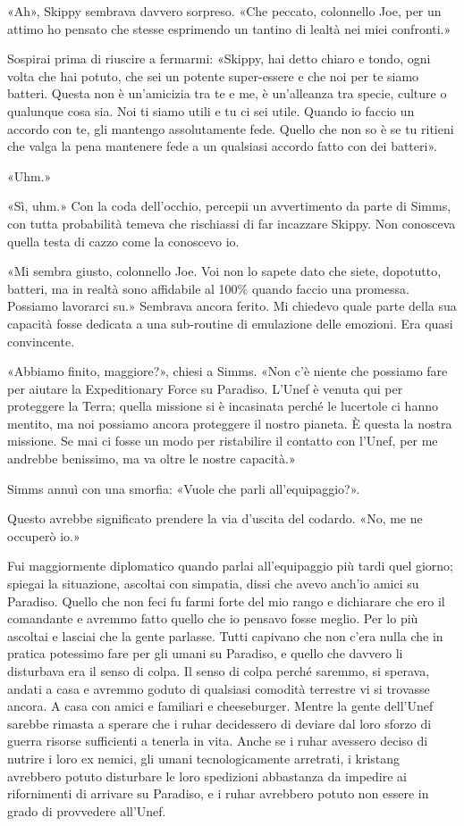 «Ah», Skippy sembrava davvero sorpreso. «Che peccato, colonnello Joe,
per un attimo ho pensato che stesse esprimendo un tantino di lealtà nei
miei confronti.»

Sospirai prima di riuscire a fermarmi: «Skippy, hai detto chiaro e
tondo, ogni volta che hai potuto, che sei un potente super-essere e che
noi per te siamo batteri. Questa non è un'amicizia tra te e me, è
un'alleanza tra specie, culture o qualunque cosa sia. Noi ti siamo utili
e tu ci sei utile. Quando io faccio un accordo con te, gli mantengo
assolutamente fede. Quello che non so è se tu ritieni che valga la pena
mantenere fede a un qualsiasi accordo fatto con dei batteri».

«Uhm.»

«Sì, uhm.» Con la coda dell'occhio, percepii un avvertimento da parte di
Simms, con tutta probabilità temeva che rischiassi di far incazzare
Skippy. Non conosceva quella testa di cazzo come la conoscevo io.

«Mi sembra giusto, colonnello Joe. Voi non lo sapete dato che siete,
dopotutto, batteri, ma in realtà sono affidabile al 100\% quando faccio
una promessa. Possiamo lavorarci su.» Sembrava ancora ferito. Mi
chiedevo quale parte della sua capacità fosse dedicata a una sub-routine
di emulazione delle emozioni. Era quasi convincente.

«Abbiamo finito, maggiore?», chiesi a Simms. «Non c'è niente che
possiamo fare per aiutare la Expeditionary Force su Paradiso. L'Unef è
venuta qui per proteggere la Terra; quella missione si è incasinata
perché le lucertole ci hanno mentito, ma noi possiamo ancora proteggere
il nostro pianeta. È questa la nostra missione. Se mai ci fosse un modo
per ristabilire il contatto con l'Unef, per me andrebbe benissimo, ma va
oltre le nostre capacità.»

Simms annuì con una smorfia: «Vuole che parli all'equipaggio?».

Questo avrebbe significato prendere la via d'uscita del codardo. «No, me
ne occuperò io.»

Fui maggiormente diplomatico quando parlai all'equipaggio più tardi quel
giorno; spiegai la situazione, ascoltai con simpatia, dissi che avevo
anch'io amici su Paradiso. Quello che non feci fu farmi forte del mio
rango e dichiarare che ero il comandante e avremmo fatto quello che io
pensavo fosse meglio. Per lo più ascoltai e lasciai che la gente
parlasse. Tutti capivano che non c'era nulla che in pratica potessimo
fare per gli umani su Paradiso, e quello che davvero li disturbava era
il senso di colpa. Il senso di colpa perché saremmo, si sperava, andati
a casa e avremmo goduto di qualsiasi comodità terrestre vi si trovasse
ancora. A casa con amici e familiari e cheeseburger. Mentre la gente
dell'Unef sarebbe rimasta a sperare che i ruhar decidessero di deviare
dal loro sforzo di guerra risorse sufficienti a tenerla in vita. Anche
se i ruhar avessero deciso di nutrire i loro ex nemici, gli umani
tecnologicamente arretrati, i kristang avrebbero potuto disturbare le
loro spedizioni abbastanza da impedire ai rifornimenti di arrivare su
Paradiso, e i ruhar avrebbero potuto non essere in grado di provvedere
all'Unef.

